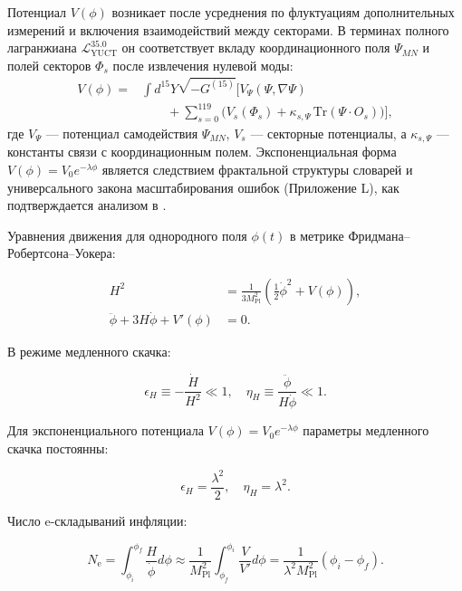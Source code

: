 \documentclass[12pt,a4paper]{article}
\theoremstyle{remark}
\newcommand{\Mpl}{M_{\mathrm{Pl}}}
\newcommand{\ninf}{N_{\mathrm{e}}}
\begin{document}
	Потенциал $V(\phi)$ возникает после усреднения по флуктуациям дополнительных измерений и включения взаимодействий между секторами. В терминах полного лагранжиана $\mathcal{L}_{\text{YUCT}}^{35.0}$ он соответствует вкладу координационного поля $\Psi_{MN}$ и полей секторов $\Phi_s$ после извлечения нулевой моды:
	\begin{align}
		V(\phi) = &\int d^{15}Y \sqrt{-G^{(15)}} \Big[ V_{\Psi}(\Psi,\nabla\Psi) \nonumber\\
		&\qquad + \sum_{s=0}^{119} \big( V_s(\Phi_s) + \kappa_{s,\Psi}\,\mathrm{Tr}(\Psi\cdot O_s) \big) \Big],
	\end{align}
	где $V_{\Psi}$ — потенциал самодействия $\Psi_{MN}$, $V_s$ — секторные потенциалы, а $\kappa_{s,\Psi}$ — константы связи с координационным полем. Экспоненциальная форма $V(\phi)=V_0 e^{-\lambda\phi}$ является следствием фрактальной структуры словарей и универсального закона масштабирования ошибок (Приложение L), как подтверждается анализом в \cite{Yakushev2026}.
	
	Уравнения движения для однородного поля $\phi(t)$ в метрике Фридмана–Робертсона–Уокера:
	
	\begin{align}
		H^2 &= \frac{1}{3\Mpl^2} \left( \frac{1}{2}\dot{\phi}^2 + V(\phi) \right), \label{eq:friedman1} \\
		\ddot{\phi} + 3H\dot{\phi} + V'(\phi) &= 0. \label{eq:field}
	\end{align}
	
	В режиме медленного скачка:
	
	\begin{equation}
		\epsilon_H \equiv -\frac{\dot{H}}{H^2} \ll 1, \quad \eta_H \equiv \frac{\ddot{\phi}}{H\dot{\phi}} \ll 1.
	\end{equation}
	
	Для экспоненциального потенциала $V(\phi) = V_0 e^{-\lambda \phi}$ параметры медленного скачка постоянны:
	
	\begin{equation}
		\epsilon_H = \frac{\lambda^2}{2}, \quad \eta_H = \lambda^2.
		\label{eq:slowroll}
	\end{equation}
	
	Число e-складываний инфляции:
	
	\begin{equation}
		\ninf = \int_{\phi_i}^{\phi_f} \frac{H}{\dot{\phi}} d\phi \approx \frac{1}{\Mpl^2} \int_{\phi_f}^{\phi_i} \frac{V}{V'} d\phi = \frac{1}{\lambda^2 \Mpl^2} (\phi_i - \phi_f).
	\end{equation}
	
\end{document}
